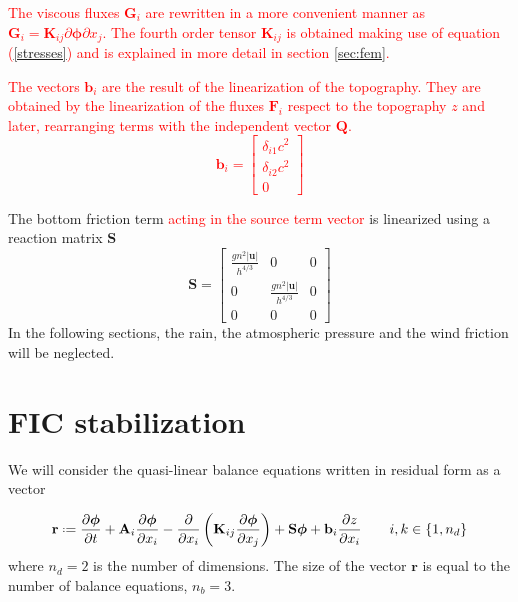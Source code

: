 \documentclass[a4paper,12pt]{elsarticle}
\newcommand{\Miguel}[1]{\textcolor{red}{#1}}
\newcommand{\pder}[2]{\frac{\partial#1}{\partial#2}}
\newcommand{\abs}[1]{\lvert#1\rvert}
\newcommand{\defeq}{\mathrel{\vcenter{\baselineskip0.5ex\lineskiplimit0pt\hbox{\scriptsize.}\hbox{\scriptsize.}}}=}
\begin{document}
\Miguel{
The viscous fluxes $\mathbf{G}_i$ are rewritten in a more convenient manner as $\mathbf{G}_i = \mathbf{K}_{ij} \partial\bm{\phi}\partial x_j$. The fourth order tensor $\mathbf{K}_{ij}$ is obtained making use of equation (\ref{stresses}) and is explained in more detail in section \ref{sec:fem}.
}

\Miguel{
The vectors $\mathbf{b}_i$ are the result of the linearization of the topography. They are obtained by the linearization of the fluxes $\mathbf{F}_i$ respect to the topography $z$ and later, rearranging terms with the independent vector $\mathbf{Q}$.
\begin{equation}
    \mathbf{b}_i = \left[\begin{matrix}
        \delta_{i1} c^2 \\
        \delta_{i2} c^2 \\
        0
    \end{matrix}\right]
\end{equation}
}

The bottom friction term \Miguel{acting in the source term vector} is linearized using a reaction matrix $\mathbf{S}$
\begin{equation}
\mathbf{S} = \left[\begin{matrix}
    \frac{gn^2\abs{\mathbf{u}}}{h^{4/3}} & 0 & 0 \\
    0 & \frac{gn^2\abs{\mathbf{u}}}{h^{4/3}} & 0 \\
    0 & 0 & 0
\end{matrix}\right]
\end{equation}
In the following sections, the rain, the atmospheric pressure and the wind friction will be neglected.

\section{FIC stabilization}\label{sec:stabilization}

We will consider the quasi-linear balance equations written in residual form as a vector

\begin{equation} \label{residual}
\mathbf{r} \defeq 
  \pder{\bm{\phi}}{t} + \mathbf{A}_i\pder{\bm{\phi}}{x_i}
  -\pder{}{x_i}\left(\mathbf{K}_{ij}\pder{\bm{\phi}}{x_j}\right) + \mathbf{S}\bm{\phi} + \mathbf{b}_i\pder{z}{x_i} \qquad i,k\in\{1,n_d\}
\end{equation}
where $n_d=2$ is the number of dimensions. The size of the vector $\mathbf{r}$ is equal to the number of balance equations, $n_b=3$.
\end{document}
